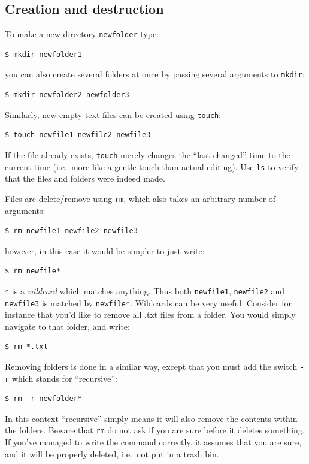 \subsection{Creation and destruction}
To make a new directory \verb|newfolder| type:

\begin{verbatim}
$ mkdir newfolder1
\end{verbatim}
you can also create several folders at once by passing several arguments to \verb|mkdir|:

\begin{verbatim}
$ mkdir newfolder2 newfolder3
\end{verbatim}
Similarly, new empty text files can be created using \verb|touch|:

\begin{verbatim}
$ touch newfile1 newfile2 newfile3
\end{verbatim}
If the file already exists, \verb|touch| merely changes the ``last changed'' time to the current time (i.e.\ more like a gentle touch than actual editing). Use \verb|ls| to verify that the files and folders were indeed made.

Files are delete/remove using \verb|rm|, which also takes an arbitrary number of arguments:
\begin{verbatim}
$ rm newfile1 newfile2 newfile3
\end{verbatim}
however, in this case it would be simpler to just write:
\begin{verbatim}
$ rm newfile*
\end{verbatim}
\verb|*| is a \emph{wildcard} which matches anything. Thus both \verb|newfile1|, \verb|newfile2| and \verb|newfile3| is matched by \verb|newfile*|. Wildcards can be very useful. Consider for instance that you'd like to remove all .txt files from a folder. You would simply navigate to that folder, and write:

\begin{verbatim}
$ rm *.txt
\end{verbatim}

Removing folders is done in a similar way, except that you must add the switch \verb|-r| which stands for ``recursive'':

\begin{verbatim}
$ rm -r newfolder*
\end{verbatim}
In this context ``recursive'' simply means it will also remove the contents within the folders. Beware that \verb$rm$ do not ask if you are sure before it deletes something. If you've managed to write the command correctly, it assumes that you are sure, and it will be properly deleted, i.e.\ not put in a trash bin.

